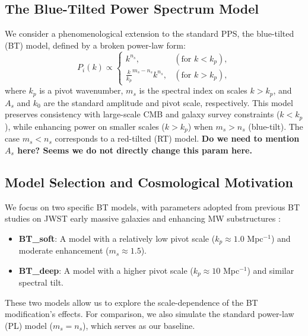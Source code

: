 \documentclass[
 reprint,
 superscriptaddress,
 nofootinbib,
 nobibnotes,
 amsmath,
 amssymb,
 aps,
 prd,
 floatfix,
 longbibliography
]{revtex4-1}
\newcommand\Jc[1]{{\color{orange}\bfseries #1}}
\begin{document}
\subsection{The Blue-Tilted Power Spectrum Model}
We consider a phenomenological extension to the standard PPS, the blue-tilted (BT) model, defined by a broken power-law form:
\begin{equation}
    P_i (k) \propto \begin{cases} k^{n_s},&\left(\text{for } k<k_p\right),\\
    \frac{k}{k_p}^{m_s-n_s} k^{n_s}, &\left(\text{for } k>k_p\right),
\end{cases}
\end{equation}
where $k_p$ is a pivot wavenumber, $m_s$ is the spectral index on scales $k > k_p$, and $A_s$ and $k_0$ are the standard amplitude and pivot scale, respectively. This model preserves consistency with large-scale CMB and galaxy survey constraints ($k < k_p$), while enhancing power on smaller scales ($k > k_p$) when $m_s > n_s$ (blue-tilt). The case $m_s < n_s$ corresponds to a red-tilted (RT) model. \Jc{Do we need to mention $A_s$ here? Seems we do not directly change this param here.}

\subsection{Model Selection and Cosmological Motivation}
We focus on two specific BT models, with parameters adopted from previous BT studies on JWST early massive galaxies\cite{Hira24bluetilt} and enhancing MW substructures \citep{Wu25BT}:
\begin{itemize}
    \item \textbf{BT\_soft}: A model with a relatively low pivot scale ($k_p \approx 1.0$ Mpc$^{-1}$) and moderate enhancement ($m_s \approx 1.5$).
    \item \textbf{BT\_deep}: A model with a higher pivot scale ($k_p \approx 10$ Mpc$^{-1}$) and similar spectral tilt.
\end{itemize}
These two models allow us to explore the scale-dependence of the BT modification's effects. For comparison, we also simulate the standard power-law (PL) model ($m_s = n_s$), which serves as our baseline.
\end{document}
